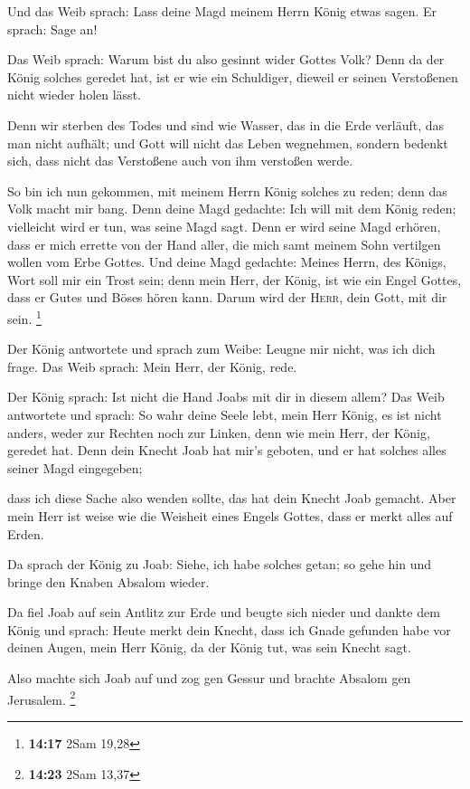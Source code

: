  Und das Weib sprach: Lass deine Magd meinem Herrn König
etwas sagen. Er sprach: Sage an!

 Das Weib sprach: Warum bist du also gesinnt wider Gottes
Volk? Denn da der König solches geredet hat, ist er wie ein Schuldiger,
dieweil er seinen Verstoßenen nicht wieder holen lässt.

 Denn wir sterben des Todes und sind wie Wasser, das in
die Erde verläuft, das man nicht aufhält; und Gott will nicht das Leben
wegnehmen, sondern bedenkt sich, dass nicht das Verstoßene auch von ihm
verstoßen werde.

 So bin ich nun gekommen, mit meinem Herrn König solches
zu reden; denn das Volk macht mir bang. Denn deine Magd gedachte: Ich
will mit dem König reden; vielleicht wird er tun, was seine Magd sagt.
 Denn er wird seine Magd erhören, dass er mich errette
von der Hand aller, die mich samt meinem Sohn vertilgen wollen vom Erbe
Gottes.  Und deine Magd gedachte: Meines Herrn, des
Königs, Wort soll mir ein Trost sein; denn mein Herr, der König, ist wie
ein Engel Gottes, dass er Gutes und Böses hören kann. Darum wird der
\textsc{Herr}, dein Gott, mit dir sein. \footnote{\textbf{14:17} 2Sam
  19,28}

 Der König antwortete und sprach zum Weibe: Leugne mir
nicht, was ich dich frage. Das Weib sprach: Mein Herr, der König, rede.

 Der König sprach: Ist nicht die Hand Joabs mit dir in
diesem allem? Das Weib antwortete und sprach: So wahr deine Seele lebt,
mein Herr König, es ist nicht anders, weder zur Rechten noch zur Linken,
denn wie mein Herr, der König, geredet hat. Denn dein Knecht Joab hat
mir's geboten, und er hat solches alles seiner Magd eingegeben;

 dass ich diese Sache also wenden sollte, das hat dein
Knecht Joab gemacht. Aber mein Herr ist weise wie die Weisheit eines
Engels Gottes, dass er merkt alles auf Erden.

 Da sprach der König zu Joab: Siehe, ich habe solches
getan; so gehe hin und bringe den Knaben Absalom wieder.

 Da fiel Joab auf sein Antlitz zur Erde und beugte sich
nieder und dankte dem König und sprach: Heute merkt dein Knecht, dass
ich Gnade gefunden habe vor deinen Augen, mein Herr König, da der König
tut, was sein Knecht sagt.

 Also machte sich Joab auf und zog gen Gessur und brachte
Absalom gen Jerusalem. \footnote{\textbf{14:23} 2Sam 13,37}

